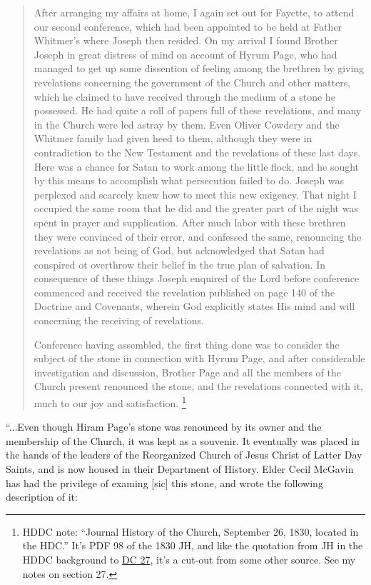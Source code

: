 				\begin{quote}
					After arranging my affairs at home, I again set out for Fayette, to attend our second conference, which had been appointed to be held at Father Whitmer's where Joseph then resided. On my arrival I found Brother Joseph in great distress of mind on account of Hyrum Page, who had managed to get up some dissention of feeling among the brethren by giving revelations concerning the government of the Church and other matters, which he claimed to have received through the medium of a stone he possessed. He had quite a roll of papers full of these revelations, and many in the Church were led astray by them. Even Oliver Cowdery and the Whitmer family had given heed to them, although they were in contradiction to the New Testament and the revelations of these last days. Here was a chance for Satan to work among the little flock, and he sought by this means to accomplish what persecution failed to do. Joseph was perplexed and scarcely knew how to meet this new exigency. That night I occupied the same room that he did and the greater part of the night was spent in prayer and supplication. After much labor with these brethren they were convinced of their error, and confessed the same, renouncing the revelations as not being of God, but acknowledged that Satan had conspired ot overthrow their belief in the true plan of salvation. In consequence of these things Joseph enquired of the Lord before conference commenced and received the revelation published on page 140 of the Doctrine and Covenants, wherein God explicitly states His mind and will concerning the receiving of revelations.
					
					Conference having assembled, the first thing done was to consider the subject of the stone in connection with Hyrum Page, and after considerable investigation and discussion, Brother Page and all the members of the Church present renounced the stone, and the revelations connected with it, much to our joy and satisfaction.%
						\footnote{%
							HDDC note: ``Journal History of the Church, September 26, 1830, located in the HDC.'' It's PDF 98 of the 1830 JH, and like the quotation from JH in the HDDC background to \hyperref[DC27]{DC 27}, it's a cut-out from some other source. See my notes on section 27.
							}
				\end{quote}
				
				``...Even though Hiram Page's stone was renounced by its owner and the membership of the Church, it was kept as a souvenir. It eventually was placed in the hands of the leaders of the Reorganized Church of Jesus Christ of Latter Day Saints, and is now housed in their Department of History. Elder Cecil McGavin has had the privilege of examing [sic] this stone, and wrote the following description of it:
				
